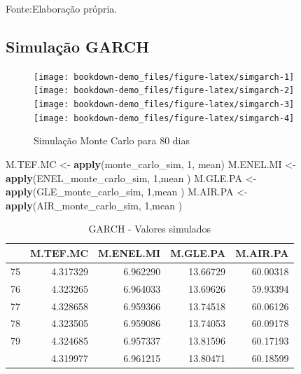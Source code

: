 \documentclass[
  12pt,
  a4paper,
  openany]{book}
\newenvironment{Shaded}{\begin{snugshade}}{\end{snugshade}}
\newcommand{\DecValTok}[1]{\textcolor[rgb]{0.00,0.00,0.81}{#1}}
\newcommand{\KeywordTok}[1]{\textcolor[rgb]{0.13,0.29,0.53}{\textbf{#1}}}
\newcommand{\NormalTok}[1]{#1}
\newcommand{\StringTok}[1]{\textcolor[rgb]{0.31,0.60,0.02}{#1}}
\begin{document}
Fonte:Elaboração própria.

\justifying
\bigskip

\hypertarget{simulauxe7uxe3o-garch}{%
\subsection{Simulação GARCH}\label{simulauxe7uxe3o-garch}}

\scriptsize

\normalsize

\scriptsize

\normalsize

\begin{figure}

{\centering \texttt{[image: bookdown-demo\_files/figure-latex/simgarch-1]} \texttt{[image: bookdown-demo\_files/figure-latex/simgarch-2]} \texttt{[image: bookdown-demo\_files/figure-latex/simgarch-3]} \texttt{[image: bookdown-demo\_files/figure-latex/simgarch-4]} 

}

\caption{Simulação Monte Carlo para 80 dias}\label{fig:simgarch}
\end{figure}

\scriptsize

\begin{Shaded}
\begin{Highlighting}[]
\NormalTok{M.TEF.MC \textless{}{-}}\StringTok{ }\KeywordTok{apply}\NormalTok{(monte\_carlo\_sim, }\DecValTok{1}\NormalTok{, mean)}
\NormalTok{M.ENEL.MI \textless{}{-}}\StringTok{ }\KeywordTok{apply}\NormalTok{(ENEL\_monte\_carlo\_sim, }\DecValTok{1}\NormalTok{,mean )}
\NormalTok{M.GLE.PA \textless{}{-}}\StringTok{ }\KeywordTok{apply}\NormalTok{(GLE\_monte\_carlo\_sim, }\DecValTok{1}\NormalTok{,mean )}
\NormalTok{M.AIR.PA \textless{}{-}}\StringTok{ }\KeywordTok{apply}\NormalTok{(AIR\_monte\_carlo\_sim, }\DecValTok{1}\NormalTok{,mean )}
\end{Highlighting}
\end{Shaded}

\normalsize
\begin{table}[!h]

\caption{\label{tab:unnamed-chunk-41}GARCH - Valores simulados}
\centering
\begin{tabular}[t]{lrrrr}
\toprule
  & M.TEF.MC & M.ENEL.MI & M.GLE.PA & M.AIR.PA\\
\midrule
75 & 4.317329 & 6.962290 & 13.66729 & 60.00318\\
76 & 4.323265 & 6.964033 & 13.69626 & 59.93394\\
77 & 4.328658 & 6.959366 & 13.74518 & 60.06126\\
78 & 4.323505 & 6.959086 & 13.74053 & 60.09178\\
79 & 4.324685 & 6.957337 & 13.81596 & 60.17193\\
\addlinespace
80 & 4.319977 & 6.961215 & 13.80471 & 60.18599\\
\bottomrule
\end{tabular}
\end{table}
\FloatBarrier
\centering
\end{document}
